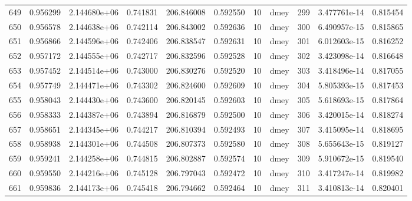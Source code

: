 \begin{tabular}{lrrrrrrlrrr}
649  &    0.956299 &        2.144680e+06 &  0.741831 &              206.846008 &    0.592550 &      10 &         dmey &    299 &   3.477761e-14 &      0.815454 \\
650  &    0.956578 &        2.144638e+06 &  0.742114 &              206.843002 &    0.592636 &      10 &         dmey &    300 &   6.490957e-15 &      0.815865 \\
651  &    0.956866 &        2.144596e+06 &  0.742406 &              206.838547 &    0.592631 &      10 &         dmey &    301 &   6.012603e-15 &      0.816252 \\
652  &    0.957172 &        2.144555e+06 &  0.742717 &              206.832596 &    0.592528 &      10 &         dmey &    302 &   3.423098e-14 &      0.816648 \\
653  &    0.957452 &        2.144514e+06 &  0.743000 &              206.830276 &    0.592520 &      10 &         dmey &    303 &   3.418496e-14 &      0.817055 \\
654  &    0.957749 &        2.144471e+06 &  0.743302 &              206.824600 &    0.592609 &      10 &         dmey &    304 &   5.805393e-15 &      0.817453 \\
655  &    0.958043 &        2.144430e+06 &  0.743600 &              206.820145 &    0.592603 &      10 &         dmey &    305 &   5.618693e-15 &      0.817864 \\
656  &    0.958333 &        2.144387e+06 &  0.743894 &              206.816879 &    0.592500 &      10 &         dmey &    306 &   3.420015e-14 &      0.818274 \\
657  &    0.958651 &        2.144345e+06 &  0.744217 &              206.810394 &    0.592493 &      10 &         dmey &    307 &   3.415095e-14 &      0.818695 \\
658  &    0.958938 &        2.144301e+06 &  0.744508 &              206.807373 &    0.592580 &      10 &         dmey &    308 &   5.655643e-15 &      0.819127 \\
659  &    0.959241 &        2.144258e+06 &  0.744815 &              206.802887 &    0.592574 &      10 &         dmey &    309 &   5.910672e-15 &      0.819540 \\
660  &    0.959550 &        2.144216e+06 &  0.745128 &              206.797043 &    0.592472 &      10 &         dmey &    310 &   3.417247e-14 &      0.819982 \\
661  &    0.959836 &        2.144173e+06 &  0.745418 &              206.794662 &    0.592464 &      10 &         dmey &    311 &   3.410813e-14 &      0.820401 \\

\end{tabular}
